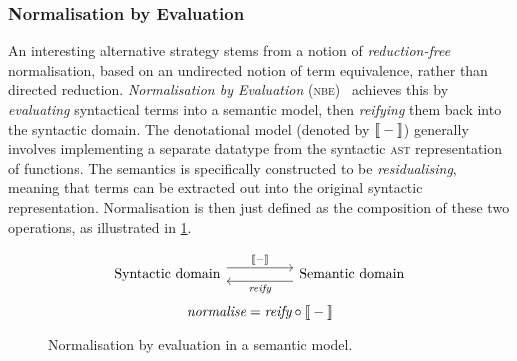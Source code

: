 \documentclass[../../../main.tex]{subfiles}
\begin{document}
\subsubsection{Normalisation by Evaluation}
An interesting alternative strategy stems from a notion of \emph{reduction-free} normalisation, based on an undirected notion of term equivalence, rather than directed reduction.
\emph{Normalisation by Evaluation} (\textsc{nbe})~\cite{filinski_nbe_2004} achieves this by \emph{evaluating} syntactical terms into a semantic model, then \emph{reifying} them back into the syntactic domain.
The denotational model (denoted by $\text{\textlbrackdbl} - \text{\textrbrackdbl}$) generally involves implementing a separate datatype from the syntactic \textsc{ast} representation of functions.
The semantics is specifically constructed to be \emph{residualising}, meaning that terms can be extracted out into the original syntactic representation.
Normalisation is then just defined as the composition of these two operations, as illustrated in \cref{fig:nbe}.

\begin{figure}
\begin{equation*}
\begin{tikzcd}
  \text{Syntactic domain} \arrow[rr, "\text{\textlbrackdbl} - \text{\textrbrackdbl}", shift left=2] &  & \text{Semantic domain} \arrow[ll, "\textit{reify}", shift left=2]
\end{tikzcd}
\end{equation*}
\vspace{0.5ex}
\begin{equation*}
\textit{normalise} = \textit{reify} \circ \text{\textlbrackdbl} - \text{\textrbrackdbl}
\end{equation*}
\caption{Normalisation by evaluation in a semantic model.}
\label{fig:nbe}
\end{figure}
\end{document}
